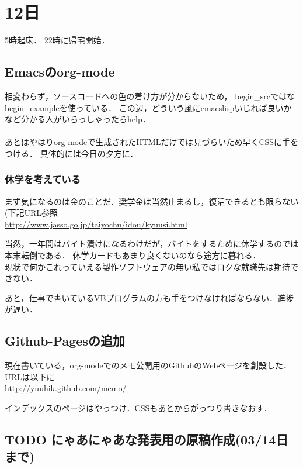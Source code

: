 \documentclass[11pt]{article}
\begin{document}
\section{12日}
\label{sec-4}

5時起床．
22時に帰宅開始．
\subsection{Emacsのorg-mode}
\label{sec-4-1}

相変わらず，ソースコードへの色の着け方が分からないため，
begin\_srcではなbegin\_exampleを使っている．
この辺，どういう風にemacslispいじれば良いかなど分かる人がいらっしゃったらhelp．
\\
\\

あとはやはりorg-modeで生成されたHTMLだけでは見づらいため早くCSSに手をつける．
具体的には今日の夕方に．
\subsubsection{休学を考えている}
\label{sec-4-1-1}

まず気になるのは金のことだ．奨学金は当然止まるし，復活できるとも限らない(下記URL参照\\
\href{http://www.jasso.go.jp/taiyochu/idou/kyuusi.html}{http://www.jasso.go.jp/taiyochu/idou/kyuusi.html}

当然，一年間はバイト漬けになるわけだが，バイトをするために休学するのでは本末転倒である．
休学カードもあまり良くないのなら途方に暮れる．\\
現状で何かこれっていえる製作ソフトウェアの無い私ではロクな就職先は期待できない．

あと，仕事で書いているVBプログラムの方も手をつけなければならない．進捗が遅い．
\subsection{Github-Pagesの追加}
\label{sec-4-2}

現在書いている，org-modeでのメモ公開用のGithubのWebページを創設した．URLは以下に\\
\href{http://yuuhik.github.com/memo/}{http://yuuhik.github.com/memo/}

インデックスのページはやっつけ．CSSもあとからがっつり書きなおす．
\subsection{\textbf{TODO} にゃあにゃあな発表用の原稿作成(03/14日まで)}
\label{sec-4-3}
\end{document}
